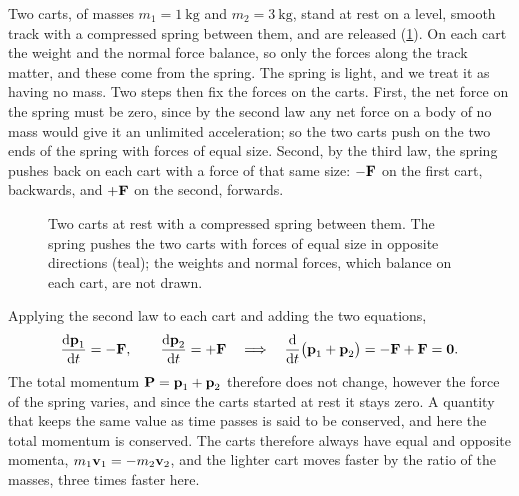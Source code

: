 Two carts, of masses $m_1 = \SI{1}{\kilogram}$ and $m_2 =
\SI{3}{\kilogram}$, stand at rest on a level, smooth track with a
compressed spring between them, and are released
(\cref{fig:ne-carts-sketch}). On each cart the weight and the normal
force balance, so only the forces along the track matter, and these come
from the spring. The spring is light, and we treat it as having no mass.
Two steps then fix the forces on the carts. First, the net force on the
spring must be zero, since by the second law any net force on a body of
no mass would give it an unlimited acceleration; so the two carts push on
the two ends of the spring with forces of equal size. Second, by the third
law, the spring pushes back on each cart with a force of that same size:
$-\bm{\mathrm{F}}$ on the first cart, backwards, and $+\bm{\mathrm{F}}$ on the second,
forwards.

\begin{figure}[htb]
\centering
{}
\caption{Two carts at rest with a compressed spring between them. The
spring pushes the two carts with forces of equal size in opposite
directions (teal); the weights and normal forces, which balance on each
cart, are not drawn.}
\label{fig:ne-carts-sketch}
\end{figure}

Applying the second law to each cart and adding the two equations,
\begin{equation*}
   \frac{\mathrm{d}\bm{\mathrm{p}}_1}{\mathrm{d} t} = -\bm{\mathrm{F}}, \qquad
   \frac{\mathrm{d}\bm{\mathrm{p}}_2}{\mathrm{d} t} = +\bm{\mathrm{F}}
   \quad\Longrightarrow\quad
   \frac{\mathrm{d}}{\mathrm{d} t}\bigl(\bm{\mathrm{p}}_1 + \bm{\mathrm{p}}_2\bigr) = -\bm{\mathrm{F}} + \bm{\mathrm{F}}
   = \bm{\mathrm{0}} .
\end{equation*}
The total momentum $\bm{\mathrm{P}} = \bm{\mathrm{p}}_1 + \bm{\mathrm{p}}_2$ therefore does not
change, however the force of the spring varies, and since the carts
started at rest it stays zero. A quantity that keeps the same value as
time passes is said to be conserved, and here the total momentum is
conserved. The carts therefore always have equal and opposite momenta,
$m_1\bm{\mathrm{v}}_1 = -m_2\bm{\mathrm{v}}_2$, and the lighter cart moves faster by the
ratio of the masses, three times faster here.

